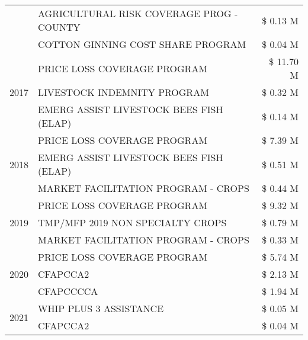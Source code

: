\begin{tabular}{llr}
 & AGRICULTURAL RISK COVERAGE PROG - COUNTY & \$ 0.13 M \\
 & COTTON GINNING COST SHARE PROGRAM & \$ 0.04 M \\
\cline{1-3}
\multirow[t]{3}{*}{2017} & PRICE LOSS COVERAGE PROGRAM & \$ 11.70 M \\
 & LIVESTOCK INDEMNITY PROGRAM & \$ 0.32 M \\
 & EMERG ASSIST LIVESTOCK BEES FISH (ELAP) & \$ 0.14 M \\
\cline{1-3}
\multirow[t]{3}{*}{2018} & PRICE LOSS COVERAGE PROGRAM & \$ 7.39 M \\
 & EMERG ASSIST LIVESTOCK BEES FISH (ELAP) & \$ 0.51 M \\
 & MARKET FACILITATION PROGRAM - CROPS & \$ 0.44 M \\
\cline{1-3}
\multirow[t]{3}{*}{2019} & PRICE LOSS COVERAGE PROGRAM & \$ 9.32 M \\
 & TMP/MFP 2019 NON SPECIALTY CROPS & \$ 0.79 M \\
 & MARKET FACILITATION PROGRAM - CROPS & \$ 0.33 M \\
\cline{1-3}
\multirow[t]{3}{*}{2020} & PRICE LOSS COVERAGE PROGRAM & \$ 5.74 M \\
 & CFAPCCA2 & \$ 2.13 M \\
 & CFAPCCCCA & \$ 1.94 M \\
\cline{1-3}
\multirow[t]{2}{*}{2021} & WHIP PLUS 3 ASSISTANCE & \$ 0.05 M \\
 & CFAPCCA2 & \$ 0.04 M \\
\cline{1-3}
\bottomrule
\end{tabular}
